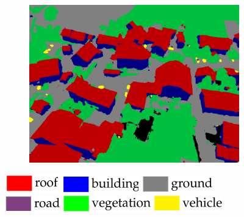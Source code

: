 \documentclass[remotesensing,article,accept,moreauthors,pdftex,10pt,a4paper]{mdpi}
\theoremstyle{mdpi}
\newcounter{ex}
\newcounter{re}
\begin{document}
\begin{figure}[H]
\begin{subfigure}[tbp]{0.21\columnwidth}
           \caption[]{}
           {{\small }}    
           \label{fig:4o}
       \end{subfigure}       
       \begin{subfigure}[tbp]{0.21\columnwidth}  
           \centering 
           \includegraphics[width=\textwidth]{segment/sullens_seg2.png}
           \caption[]{}%
           {{\small }}    
           \label{fig:4p}
      \end{subfigure}
      \protect\includegraphics[scale=1]{fig1.pdf}\quad
      \protect\includegraphics[scale=1]{fig2.pdf}\quad
      \protect\includegraphics[scale=1]{fig3.pdf}\quad
      \protect\includegraphics[scale=1]{fig4.pdf}\quad
      \protect\includegraphics[scale=1]{fig5.pdf}\quad
      \protect\includegraphics[scale=1]{fig6.pdf}\quad

\end{figure}
\end{document}
